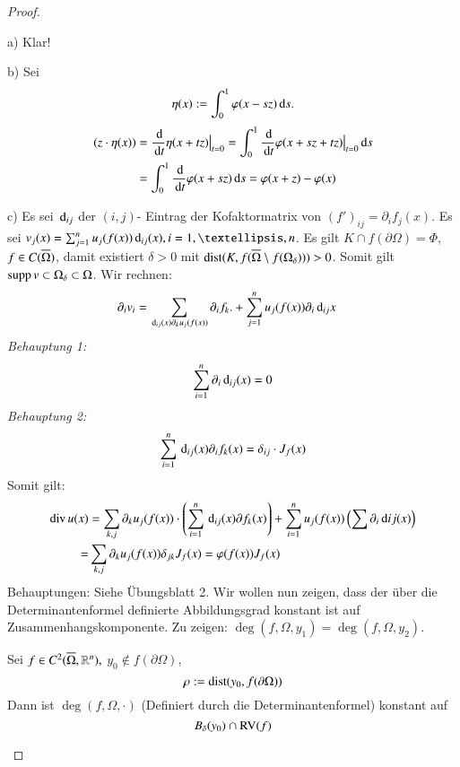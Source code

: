 \begin{proof}
    \begin{description}
    \item{a)}
    Klar!
    \item{b)}
    Sei
    \[
        \eta (x):= \int_0^1 \varphi (x-sz) \, \mathrm{d} s.
    \]
    \begin{align*}
        (z\cdot \eta(x))&=\frac{\, \mathrm{d}}{\, \mathrm{d} t } \eta (x+tz)\big|_{t=0}=\int_0^1 \frac{\, \mathrm{d}}{\, \mathrm{d} t} \varphi(x+sz+tz)
       \big|_{t=0} \, \mathrm{d} s\\
        &= \int_0^1 \frac{\, \mathrm{d}}{\, \mathrm{d} t} \varphi(x+sz)\, \mathrm{d} s=\varphi(x+z)-\varphi(x)
    \end{align*}
    \item{c)}
    Es sei $\, \mathrm{d} _{ij}$ der $(i,j)$- Eintrag der Kofaktormatrix von $(f')_{ij}= \partial _if_j(x)$.
    Es sei $v_j(x)=\sum_{j=1}^n u_j(f(x))\d _{ij}(x),i=1,…,n$. Es gilt $K\cap f(\partial \Omega) = \Phi$,
    $f\in C(\overline \Omega)$, damit existiert $\delta>0$ mit $\mathrm{dist}(K,f(\overline \Omega \setminus 
                f(\Omega_\delta)))>0$.
    Somit gilt $\mathrm{supp}\, v\subset \Omega_\delta\subset \Omega$.
    Wir rechnen:
    \begin{align*}
        \partial_iv_i&= \sum_{\, \mathrm{d} _{ij}(x)\partial_ku_j(f(x))}\partial _i f_k.+\sum_{j=1}^nu_j(f(x))
        \partial_i \, \mathrm{d}_{ij}x
    \end{align*}
    \textit{Behauptung 1:}
    \[
        \sum_{i=1}^n \partial_i\, \mathrm{d}_{ij}(x)=0
    \]
    \textit{Behauptung 2:}
    \[
        \sum_{i=1}^n \, \mathrm{d}_{ij} (x) \partial_if_k(x) =\delta_{ij}\cdot J_f(x)
    \]
    Somit gilt:
    \begin{align*}
        \mathrm{div}\, u(x)&=\sum_{k,j}\partial _k u_j(f(x))\cdot \left( \sum_{i=1}^n \, \mathrm{d}_{ij}(x) \partial f_k(x) 
                \right) +\sum_{i=1}^nu_j(f(x)) \left( \sum \partial _i \, \mathrm{d} {ij}(x) \right)\\
        =&\sum_{k,j}\partial _k u_j(f(x))\delta _{jk} J_f(x)=\varphi(f(x))J_f(x)
    \end{align*}
    Behauptungen: Siehe Übungsblatt 2.
    Wir wollen nun zeigen, dass der über die Determinantenformel definierte Abbildungsgrad konstant
    ist auf Zusammenhangskomponente. Zu zeigen: $\deg(f,\Omega,y_1)=\deg(f,\Omega,y_2)$.

    \begin{lem}\label{2.8}
        Sei $f\in C^2(\overline \Omega,\mathbb{R}^n),$ $ y_0\nin f(\partial \Omega) $,
        \[
            \rho:=\mathrm{dist}(y_0,f(\partial \Omega))
        \]
        Dann ist $\deg(f,\Omega,\cdot)$ (Definiert durch die Determinantenformel) konstant auf
        \[
            B_\delta (y_0)\cap \mathrm{RV}(f)
        \]
    \end{lem}


\end{description}
\end{proof}
